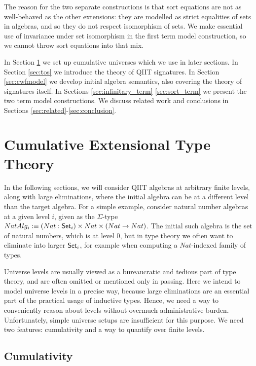 \documentclass{llncs}
\begin{document}
The reason for the two separate constructions is that sort equations are not as
well-behaved as the other extensions: they are modelled as strict equalities of
sets in algebras, and so they do not respect isomorphism of sets. We make
essential use of invariance under set isomorphism in the first term model
construction, so we cannot throw sort equations into that mix.

In Section \ref{sec:levels} we set up cumulative universes which we use in later
sections. In Section \ref{sec:tos} we introduce the theory of QIIT
signatures. In Section \ref{sec:cwfmodel} we develop initial algebra semantics,
also covering the theory of signatures itself. In Sections
\ref{sec:infinitary_term}-\ref{sec:sort_term} we present the two term model
constructions. We discuss related work and conclusions in Sections
\ref{sec:related}-\ref{sec:conclusion}.


\section{Cumulative Extensional Type Theory}
\label{sec:levels}

In the following sections, we will consider QIIT algebras at arbitrary finite
levels, along with large eliminations, where the initial algebra can be at a
different level than the target algebra. For a simple example, consider natural
number algebras at a given level $i$, given as the $\Sigma$-type $NatAlg_i :\equiv(Nat :
\mathsf{Set}_i)\times Nat\times(Nat \rightarrow Nat)$. The initial such algebra is the set of
natural numbers, which is at level $0$, but in type theory we often want to
eliminate into larger $\mathsf{Set}_i$, for example when computing a $Nat$-indexed family
of types.

Universe levels are usually viewed as a bureaucratic and tedious part of type
theory, and are often omitted or mentioned only in passing. Here we intend to
model universe levels in a precise way, because large eliminations are an
essential part of the practical usage of inductive types. Hence, we need a way
to conveniently reason about levels without overmuch administrative
burden. Unfortunately, simple universe setups are insufficient for this
purpose. We need two features: cumulativity and a way to quantify over finite
levels.

\subsection{Cumulativity}
\end{document}
